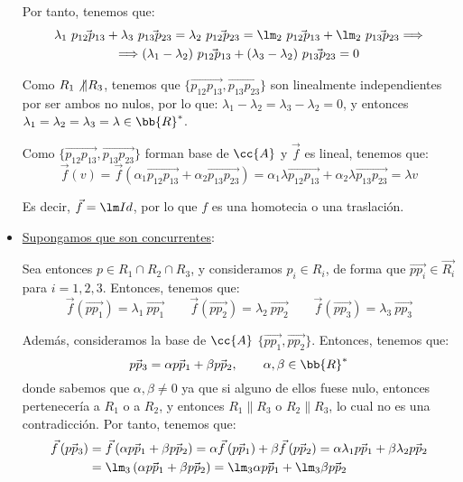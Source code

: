 \begin{ejercicio}
\begin{itemize}
        Por tanto, tenemos que:
        \begin{multline*}
            \lambda_1~ \vec{p_{12}p_{13}} + \lambda_3~ \vec{p_{13}p_{23}} =
            \lambda_2~ \vec{p_{12}p_{23}} = \lm_2~\vec{p_{12}p_{13}} + \lm_2~\vec{p_{13}p_{23}}
            \Longrightarrow \\ \Longrightarrow (\lambda_1-\lambda_2)~ \vec{p_{12}p_{13}} + (\lambda_3-\lambda_2)~ \vec{p_{13}p_{23}} = 0
        \end{multline*}

        Como $R_1\not\|R_3$, tenemos que $\{\vec{p_{12}p_{13}}, \vec{p_{13}p_{23}}\}$ son linealmente independientes por ser ambos no nulos, por lo que:
        $\lambda_1-\lambda_2 = \lambda_3-\lambda_2 = 0$, y entonces $\lambda_1=\lambda_2=\lambda_3=\lambda \in \bb{R}^\ast$.

        Como $\{\vec{p_{12}p_{13}}, \vec{p_{13}p_{23}}\}$ forman base de $\cc{A}$ y $\vec{f}$ es lineal, tenemos que:
        \begin{equation*}
            \vec{f}(v) = \vec{f}\left(\alpha_1 \vec{p_{12}p_{13}} + \alpha_2 \vec{p_{13}p_{23}}\right)
            = \alpha_1 \lambda \vec{p_{12}p_{13}} + \alpha_2 \lambda \vec{p_{13}p_{23}} = \lambda v
        \end{equation*}

        Es decir, $\vec{f}=\lm Id$, por lo que $f$ es una homotecia o una traslación.

        \item \ul{Supongamos que son concurrentes}:
        
        Sea entonces $p\in R_1\cap R_2\cap R_3$, y consideramos $p_i\in R_i$, de forma que $\vec{pp_i}\in \vec{R_i}$ para $i=1,2,3$.
        Entonces, tenemos que:
        \begin{equation*}
            \vec{f}(\vec{pp_1}) = \lambda_1~ \vec{pp_1} \qquad
            \vec{f}(\vec{pp_2}) = \lambda_2~ \vec{pp_2} \qquad
            \vec{f}(\vec{pp_3}) = \lambda_3~ \vec{pp_3}
        \end{equation*}

        Además, consideramos la base de $\cc{A}$ $\{\vec{pp_1}, \vec{pp_2}\}$. Entonces, tenemos que:
        \begin{equation*}
            \vec{pp_3} = \alpha \vec{pp_1} + \beta \vec{pp_2}, \qquad \alpha,\beta\in \bb{R}^\ast
        \end{equation*}
        donde sabemos que $\alpha, \beta\neq 0$ ya que si alguno de ellos fuese nulo,
        entonces pertenecería a $R_1$ o a $R_2$, y entonces $R_1\|R_3$ o $R_2\|R_3$, lo cual no es una contradicción.
        Por tanto, tenemos que:
        \begin{align*}
            \vec{f}\left(\vec{pp_3}\right) &
            = \vec{f}\left(\alpha \vec{pp_1} + \beta \vec{pp_2}\right)
            = \alpha \vec{f}\left(\vec{pp_1}\right) + \beta \vec{f}\left(\vec{pp_2}\right)
            = \alpha \lambda_1 \vec{pp_1} + \beta \lambda_2 \vec{pp_2}\\&
            = \lm_3 \left(\alpha \vec{pp_1} + \beta \vec{pp_2}\right)
            = \lm_3 \alpha \vec{pp_1} + \lm_3 \beta \vec{pp_2}
        \end{align*}


\end{itemize}
\end{ejercicio}
